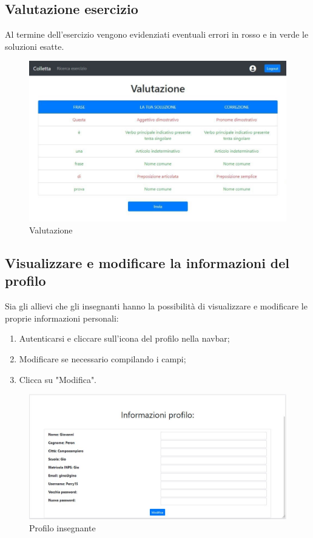 \documentclass[11pt,a4paper]{article}
\begin{document}
{	\newpage
	
	\subsection{Valutazione esercizio}
	Al termine dell'esercizio vengono evidenziati eventuali errori in rosso e in verde le soluzioni esatte.
		\begin{figure}[h!]
		\centering
		\includegraphics[scale=0.65]{images/valutazione.jpg}
		\caption{Valutazione}
	\end{figure}
	
	\subsection{Visualizzare e modificare la informazioni del profilo}
	Sia gli allievi che gli insegnanti hanno la possibilità di visualizzare e modificare le proprie informazioni personali:
	\begin{enumerate}
		\item Autenticarsi e cliccare sull'icona del profilo nella navbar;
		\item Modificare se necessario compilando i campi;
		\item Clicca su "Modifica".
	\end{enumerate}

	\begin{figure}[h]
		\centering
		\includegraphics[scale=0.65]{images/profiloinsegnante.jpg}
		\caption{Profilo insegnante}
	\end{figure}
	
}
\end{document}
